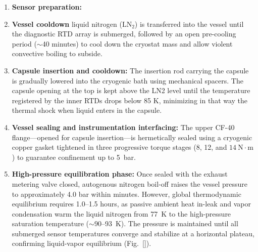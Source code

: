 \documentclass[preprint,11pt]{elsarticle}
\begin{document}
\begin{enumerate}
    \item \textbf{Sensor preparation:} 
    
    \item \textbf{Vessel cooldown} liquid nitrogen ($\text{LN}_2$) is transferred into the vessel until the diagnostic RTD array is submerged, followed by an open pre-cooling period ($\sim$40 minutes) to cool down the cryostat mass and allow violent convective boiling to subside.
    
    \item \textbf{Capsule insertion and cooldown:} The insertion rod carrying the capsule is gradually lowered into the cryogenic bath using mechanical spacers. The capsule opening at the top is kept above the LN2 level until the temperature registered by the inner RTDs drops below 85 K, minimizing in that way the thermal shock when liquid enters in the capsule.  
    
    \item \textbf{Vessel sealing and instrumentation interfacing:} The upper CF-40 flange---opened for capsule insertion---is hermetically sealed using a cryogenic copper gasket tightened in three progressive torque stages (8, 12, and $14~\text{N}\cdot\text{m}$) to guarantee confinement up to 5~bar. 
    
    \item \textbf{High-pressure equilibration phase:} 
    Once sealed with the exhaust metering valve closed, autogenous nitrogen boil-off raises the vessel pressure to approximately 4.0 bar within minutes. However, global thermodynamic equilibrium requires 1.0--1.5 hours, as passive ambient heat in-leak and vapor condensation warm the liquid nitrogen from 77~K to the high-pressure saturation temperature ($\sim$90--93~K). The pressure is maintained until all submerged sensor temperatures converge and stabilize at a horizontal plateau, confirming liquid-vapor equilibrium (Fig.~\ref{}).
    

\end{enumerate}
\end{document}
